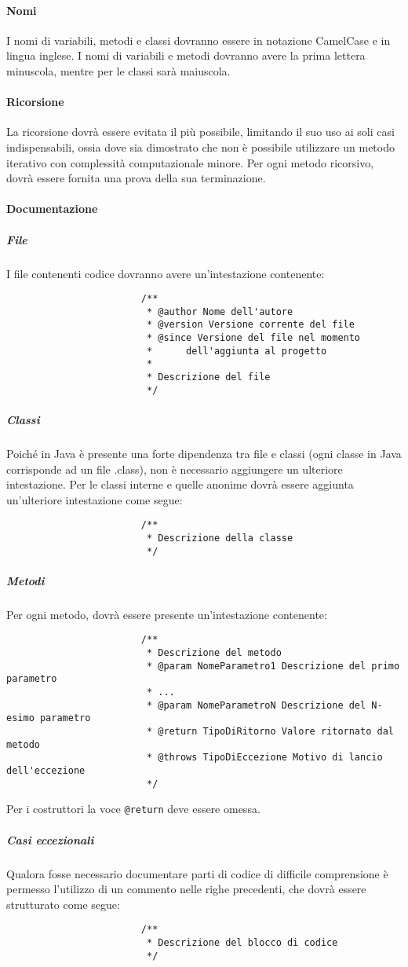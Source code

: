 \documentclass[../NormeProgetto.tex]{subfiles}
\begin{document}
			\paragraph{Nomi}
				I nomi di variabili, metodi e classi dovranno essere in notazione CamelCase e in lingua inglese. I nomi di variabili e metodi dovranno avere la prima lettera minuscola, mentre per le classi sarà maiuscola.
			\paragraph{Ricorsione}
				La ricorsione dovrà essere evitata il più possibile, limitando il suo uso ai soli casi indispensabili, ossia dove sia dimostrato che non è possibile utilizzare un metodo iterativo con complessità computazionale minore. Per ogni metodo ricorsivo, dovrà essere fornita una prova della sua terminazione.
			\paragraph{Documentazione}
				\subparagraph{File}
					I file contenenti codice dovranno avere un'intestazione contenente:
					\begin{lstlisting}
						/**
						 * @author Nome dell'autore
						 * @version Versione corrente del file 
						 * @since Versione del file nel momento
						 *		dell'aggiunta al progetto
						 *
						 * Descrizione del file
						 */
					\end{lstlisting}
				\subparagraph{Classi}
					Poiché in Java è presente una forte dipendenza tra file e classi (ogni classe in Java corrisponde ad un file .class), non è necessario aggiungere un ulteriore intestazione. Per le classi interne e quelle anonime dovrà essere aggiunta un'ulteriore intestazione come segue:
					\begin{lstlisting}
						/**
						 * Descrizione della classe
						 */
					\end{lstlisting}
				\subparagraph{Metodi}
					Per ogni metodo, dovrà essere presente un'intestazione contenente:
					\begin{lstlisting}
						/**
						 * Descrizione del metodo
						 * @param NomeParametro1 Descrizione del primo parametro
						 * ...
						 * @param NomeParametroN Descrizione del N-esimo parametro
						 * @return TipoDiRitorno Valore ritornato dal metodo
						 * @throws TipoDiEccezione Motivo di lancio dell'eccezione
						 */
					\end{lstlisting}
					
					Per i costruttori la voce \texttt{@return} deve essere omessa.
				\subparagraph{Casi eccezionali}
					Qualora fosse necessario documentare parti di codice di difficile comprensione è permesso l'utilizzo di un commento nelle righe precedenti, che dovrà essere strutturato come segue:
					\begin{lstlisting}
						/**
						 * Descrizione del blocco di codice
						 */
					\end{lstlisting}
\end{document}
